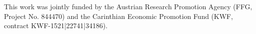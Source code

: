 This work was jointly funded by the Austrian Research Promotion Agency (FFG, Project No. 844470) and the Carinthian Economic Promotion Fund (KWF, contract KWF-1521|22741|34186).
